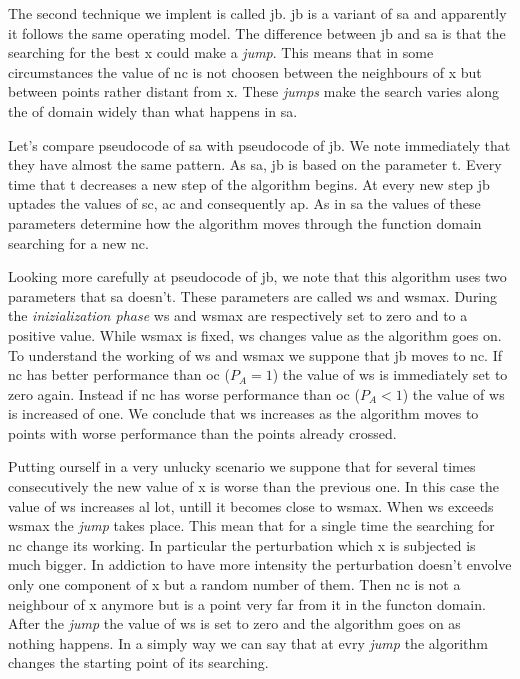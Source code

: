 \documentclass[journal]{IEEEtran}
\begin{document}
The second technique we implent is called \gls{jb}. \gls{jb} is a variant of \gls{sa} and apparently it follows the same operating model. The difference between \gls{jb} and \gls{sa} is that the searching for the best \gls{x} could make a \textit{jump}. This means that in some circumstances the value of \gls{nc} is not choosen between the neighbours of \gls{x} but between points rather distant from \gls{x}. These \textit{jumps} make the search  varies along the \gls{of} domain widely than what happens in \gls{sa}.

Let's compare pseudocode of \gls{sa} with pseudocode of \gls{jb}. We note immediately that they have almost the same pattern. As \gls{sa}, \gls{jb} is based on the parameter \gls{t}. Every time that \gls{t} decreases a new step of the algorithm begins. At every new step \gls{jb} uptades the values of \gls{sc}, \gls{ac} and consequently \gls{ap}. As in \gls{sa} the values of these parameters determine how the algorithm moves through the function domain searching for a new \gls{nc}.

Looking more carefully at pseudocode of \gls{jb}, we note that this algorithm uses two parameters that \gls{sa} doesn't. These parameters are called \gls{ws} and \gls{wsmax}. During the \textit{inizialization phase}  \gls{ws} and \gls{wsmax} are respectively set to zero and to a positive value. While \gls{wsmax} is fixed, \gls{ws} changes value as the algorithm goes on. To understand the working of \gls{ws} and \gls{wsmax} we suppone that \gls{jb} moves to \gls{nc}. If \gls{nc} has better performance than \gls{oc} ($P_A=1$) the value of \gls{ws} is immediately set to zero again. Instead if \gls{nc} has worse performance than \gls{oc} ($P_A<1$) the value of \gls{ws} is increased of one. We conclude that \gls{ws} increases as the algorithm moves to points with worse performance than the points already crossed.

Putting ourself in a very unlucky scenario we suppone that for several times consecutively the new value of \gls{x} is worse than the previous one. In this case the value of \gls{ws} increases al lot, untill it becomes close to \gls{wsmax}. When \gls{ws} exceeds \gls{wsmax} the \textit{jump} takes place. This mean that for a single time the searching for \gls{nc} change its working. In particular the perturbation which \gls{x} is subjected is much bigger. In addiction to have more intensity the perturbation doesn't envolve only one component of \gls{x} but a random number of them. Then \gls{nc} is not a neighbour of \gls{x} anymore but is a point very far from it in the functon domain. After the \textit{jump} the value of \gls{ws} is set to zero and the algorithm goes on as nothing happens. In a simply way we can say that at evry \textit{jump} the algorithm changes the starting point of its searching.
\end{document}
